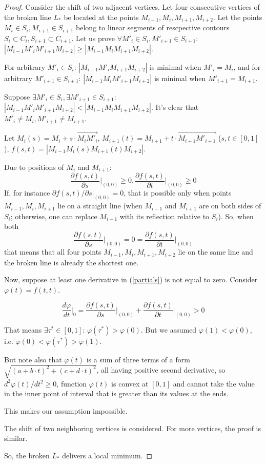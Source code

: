 \documentclass[]{interact}
\theoremstyle{plain}%
\theoremstyle{definition}
\theoremstyle{remark}
\begin{document}
\begin{proof}
Consider the shift of two adjacent vertices.
Let four consecutive vertices of the broken line
$L_*$
be located at the points
$M_{i-1}, M_i, M_{i+1}, M_{i+2}$.
Let the points
$M_i \in S_i,
M_{i+1} \in S_{i+1}$
belong to linear segments
of rescpective contours
$S_i \subset C_i,
S_{i+1} \subset C_{i+1}$.
Let us prove
$
\forall M'_i \in S_i,
M'_{i+1} \in S_{i+1}
$:
$
|M_{i-1} M'_i M'_{i+1} M_{i+2}|
\ge
|M_{i-1} M_i M_{i+1} M_{i+2}|
$.

For arbitrary
$M'_i \in S_i$:
$|M_{i-1} M'_i M_{i+1} M_{i+2}|$
is minimal when $M'_i=M_i$,
and
for arbitrary
$M'_{i+1} \in S_{i+1}$:
$|M_{i-1} M_i M'_{i+1} M_{i+2}|$
is minimal when $M'_{i+1}=M_{i+1}$.

Suppose
$
\exists M'_i \in S_i,
\exists M'_{i+1} \in S_{i+1}
$:
$
|M_{i-1} M'_i M'_{i+1} M_{i+2}|
<
|M_{i-1} M_i M_{i+1} M_{i+2}|
$.
It's clear that
$
M'_i \ne M_i,
M'_{i+1} \ne M_{i+1}
$.

Let
$
M_i(s)=M_i+s \cdot \overrightarrow{M_i M'_i}
$,
$
 M_{i+1}(t)= M_{i+1}+t \cdot \overrightarrow{M_{i+1} M'_{i+1}}
$
($s,t \in[0,1]$),
$f(s,t)=
|M_{i-1} M_i(s) M_{i+1}(t) M_{i+2}|
$.

Due to positions of
$M_i$ and $M_{i+1}$:
\begin{equation}
\frac{\partial f(s,t)}{\partial s} \Big|_{(0,0)} \ge 0,
\frac{\partial f(s,t)}{\partial t} \Big|_{(0,0)} \ge 0
\label{partials}
\end{equation}
If,
for instance
$\partial f(s,t) / \partial s \big|_{(0,0)} = 0$,
that is possible only
when
points
$M_{i-1}, M_i, M_{i+1}$
lie on a straight line
(when $M_{i-1}$ and $M_{i+1}$
are on both sides of
$S_i$;
otherwise,
one can replace
$M_{i-1}$ with its reflection
relative to
$S_i$).
So, when both
$$
\frac{\partial f(s,t)}{\partial s} \Big|_{(0,0)}
= 0 =
\frac{\partial f(s,t)}{\partial t} \Big|_{(0,0)}
$$
that means that all four points
$M_{i-1}, M_i, M_{i+1}, M_{i+2}$
lie on the same line
and the broken line is already
the shortest one.

Now,
suppose
at least one derivative in
(\ref{partials})
is not equal to zero.
Consider
$\varphi(t)=f(t,t)$.

$$
\frac{d\varphi}{dt} \Big|_0 =
\frac{\partial f(s,t)}{\partial s} \Big|_{(0,0)}
+
\frac{\partial f(s,t)}{\partial t} \Big|_{(0,0)}
>0
$$

That means
$\exists \tau^* \in [0,1]$:
$\varphi(\tau^*) > \varphi(0)$.
But we assumed
$\varphi(1)<\varphi(0)$,
i.e.
$\varphi(0)<\varphi(\tau^*)>\varphi(1)$.

But note also
that
$\varphi(t)$ is a sum of three terms of a form
$\sqrt{(a+b\cdot t)^2 + (c+d \cdot t)^2}$,
all having positive second derivative,
so
$d^2\varphi(t)/dt^2 \ge 0$,
function
$\varphi(t)$ is convex at
$[0,1]$
and cannot take the value
in the inner point of interval
that is greater than its values
at the ends.

This makes our assumption impossible.

The shift of two neighboring vertices is considered. For more vertices, the proof is similar.

So, the broken
$L_*$
delivers a local minimum.
\end{proof}
\end{document}

